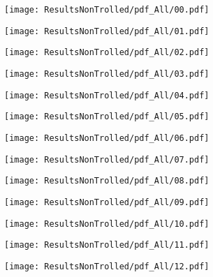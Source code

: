 {  \centerline{\texttt{[image: ResultsNonTrolled/pdf\_All/00.pdf]}  } }


{  \centerline{\texttt{[image: ResultsNonTrolled/pdf\_All/01.pdf]}  } }


{  \centerline{\texttt{[image: ResultsNonTrolled/pdf\_All/02.pdf]}  } }


{  \centerline{\texttt{[image: ResultsNonTrolled/pdf\_All/03.pdf]}  } }


{  \centerline{\texttt{[image: ResultsNonTrolled/pdf\_All/04.pdf]}  } }


{  \centerline{\texttt{[image: ResultsNonTrolled/pdf\_All/05.pdf]}  } }


{  \centerline{\texttt{[image: ResultsNonTrolled/pdf\_All/06.pdf]}  } }


{  \centerline{\texttt{[image: ResultsNonTrolled/pdf\_All/07.pdf]}  } }


{  \centerline{\texttt{[image: ResultsNonTrolled/pdf\_All/08.pdf]}  } }


{  \centerline{\texttt{[image: ResultsNonTrolled/pdf\_All/09.pdf]}  } }


{  \centerline{\texttt{[image: ResultsNonTrolled/pdf\_All/10.pdf]}  } }


{  \centerline{\texttt{[image: ResultsNonTrolled/pdf\_All/11.pdf]}  } }


{  \centerline{\texttt{[image: ResultsNonTrolled/pdf\_All/12.pdf]}  } }


